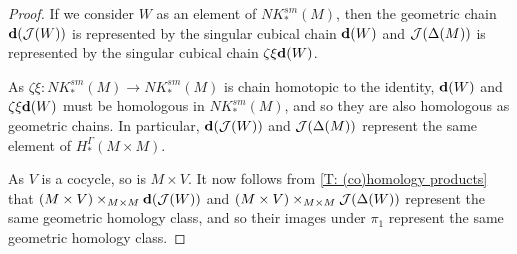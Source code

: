 \begin{proof}
	If we consider $W$ as an element of $NK_*^{sm}(M)$, then the geometric chain $\mathbf{d}(\mathcal{J}(W))$ is represented by the singular cubical chain $\mathbf{d}(W)$ and $\mathcal{J}(\Delta(M))$ is represented by the singular cubical chain $\zeta\xi\mathbf{d}(W)$.

	As $\zeta\xi: NK_*^{sm}(M) \to NK_*^{sm}(M)$ is chain homotopic to the identity, $\mathbf{d}(W)$ and $\zeta\xi\mathbf{d}(W)$ must be homologous in $NK_*^{sm}(M)$, and so they are also homologous as geometric chains.
	In particular, $\mathbf{d}(\mathcal{J}(W))$ and $\mathcal{J}(\Delta(M))$ represent the same element of $H_*^\Gamma(M \times M)$.

	As $V$ is a cocycle, so is $M \times V$.
	It now follows from \cref{T: (co)homology products} that
	$(M \times V)\times_{M \times M} \mathbf{d}(\mathcal{J}(W))$ and $(M \times V)\times_{M \times M} \mathcal{J}(\Delta(W))$ represent the same geometric homology class, and so their images under $\pi_1$ represent the same geometric homology class.
\end{proof}

\begin{comment}
	Let $E$ be a face of the cubulation.
	Then we can think of $E$ as corresponding to a smooth singular cubical chain represented by the embedding $S_E \colon \interval^n \to M$.
	Then $\diag(\mc J(W))$ is the geometric chain represented by the smooth singular cubical chain $\diag S_E \colon \interval^n \to M \times M$, while $\mc J(\Delta(M))$ is the geometric chain represented by the smooth singular cubical chain $\zeta\xi(\diag S_E)$.
	So, more generally, $\diag(\mc J(W))$ and $\mc J(\Delta(W)))$ must be homologous in $NK^{sm}(M)$.
	So there is a smooth cubical chain $Z$ with $\bd Z = \diag(\mc J(W))-\mc J(\Delta(W)))$ as normalized smooth cubical chains.
	Now thinking of $H$ as a geometric chain, by Lemma \ref{L: product transversal}, we can find a cocycle $V'$ homologous to $V$ so that $M \times V'$ is transverse to $Z$.
	Now we compute using the boundary formula of Proposition \ref{P: Leibniz cap} and that $M \times V'$ is a cocycle that
	\begin{align*}
		\bd((M \times V')&\times_{M \times M} Z)\\
		& = \pm(\bd(M \times V'))\times_{M \times M} Z +(M \times V')\times_{M \times M} \bd Z \\
		& = (M \times V')\times_{M \times M} (\diag(\mc J(W))-\mc J(\Delta(W)))\\
		& = (M \times V')\times_{M \times M} \diag(\mc J(W)) - (M \times V')\times_{M \times M} \mc J(\Delta(W))
	\end{align*}
	Applying $\pi_1$ and that boundaries commute with maps, we obtained the desired homology.
\end{comment}

